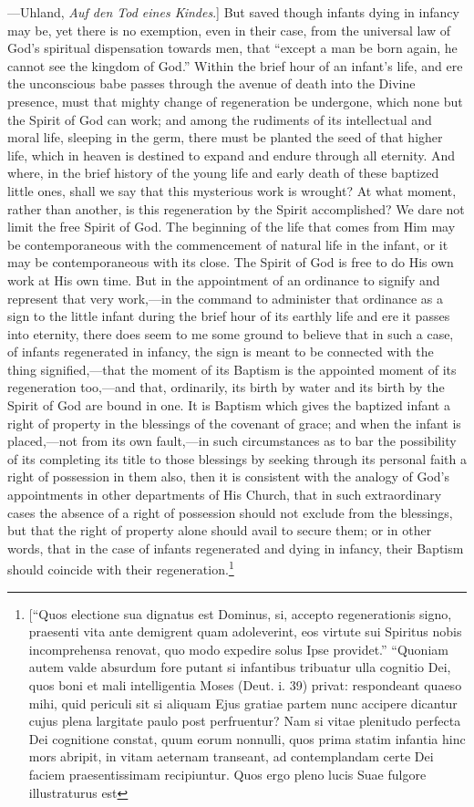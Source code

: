 \documentclass[]{book}
\begin{document}
{  ---Uhland, \emph{Auf den Tod eines Kindes}.{]}} But saved though infants dying in infancy may be, yet there is no exemption, even in their case, from the universal law of God's spiritual dispensation towards men, that ``except a man be born again, he cannot see the kingdom of God.'' Within the brief hour of an infant's life, and ere the unconscious babe passes through the avenue of death into the Divine presence, must that mighty change of regeneration be undergone, which none but the Spirit of God can work; and among the rudiments of its intellectual and moral life, sleeping in the germ, there must be planted the seed of that higher life, which in heaven is destined to expand and endure through all eternity. And where, in the brief history of the young life and early death of these baptized little ones, shall we say that this mysterious work is wrought? At what moment, rather than another, is this regeneration by the Spirit accomplished? We dare not limit the free Spirit of God. The beginning of the life that comes from Him may be contemporaneous with the commencement of natural life in the infant, or it may be contemporaneous with its close. The Spirit of God is free to do His own work at His own time. But in the appointment of an ordinance to signify and represent that very work,---in the command to administer that ordinance as a sign to the little infant during the brief hour of its earthly life and ere it passes into eternity, there does seem to me some ground to believe that in such a case, of infants regenerated in infancy, the sign is meant to be connected with the thing signified,---that the moment of its Baptism is the appointed moment of its regeneration too,---and that, ordinarily, its birth by water and its birth by the Spirit of God are bound in one. It is Baptism which gives the baptized infant a right of property in the blessings of the covenant of grace; and when the infant is placed,---not from its own fault,---in such circumstances as to bar the possibility of its completing its title to those blessings by seeking through its personal faith a right of possession in them also, then it is consistent with the analogy of God's appointments in other departments of His Church, that in such extraordinary cases the absence of a right of possession should not exclude from the blessings, but that the right of property alone should avail to secure them; or in other words, that in the case of infants regenerated and dying in infancy, their Baptism should coincide with their regeneration.\footnote{{[}``Quos electione sua dignatus est Dominus, si, accepto regenerationis signo, praesenti vita ante demigrent quam adoleverint, eos virtute sui Spiritus nobis incomprehensa renovat, quo modo expedire solus Ipse providet.'' ``Quoniam autem valde absurdum fore putant si infantibus tribuatur ulla cognitio Dei, quos boni et mali intelligentia Moses (Deut. i. 39) privat: respondeant quaeso mihi, quid periculi sit si aliquam Ejus gratiae partem nunc accipere dicantur cujus plena largitate paulo post perfruentur? Nam si vitae plenitudo perfecta Dei cognitione constat, quum eorum nonnulli, quos prima statim infantia hinc mors abripit, in vitam aeternam transeant, ad contemplandam certe Dei faciem praesentissimam recipiuntur. Quos ergo pleno lucis Suae fulgore illustraturus est }
\end{document}
